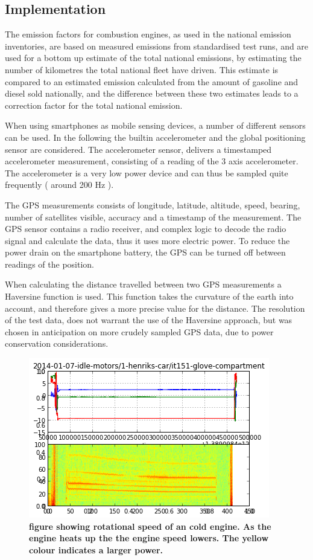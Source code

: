 \subsection {Implementation}
The emission factors for combustion engines, as used in the national emission inventories, are based on measured emissions from standardised test runs, and are used for a bottom up estimate of the total national emissions, by estimating the number of kilometres the total national fleet have driven. This estimate is compared to an estimated emission calculated from the amount of gasoline and diesel sold nationally, and the difference between these two estimates leads to a correction factor for the total national emission.

When using smartphones as mobile sensing devices, a number of different sensors can be used. In the following the builtin accelerometer and the global positioning sensor are considered. The accelerometer sensor, delivers a timestamped accelerometer measurement, consisting of a reading of the 3 axis accelerometer. The accelerometer is a very low power device and can thus be sampled quite frequently ( around 200 Hz ).

The GPS measurements consists of longitude, latitude, altitude, speed, bearing, number of satellites visible, accuracy and a timestamp of the measurement. The GPS sensor contains a radio receiver, and complex logic to decode the radio signal and calculate the data, thus it uses more electric power. To reduce the power drain on the smartphone battery, the GPS can be turned off between readings of the position. 

When calculating the distance travelled between two GPS measurements a Haversine function is used. This function takes the curvature of the earth into account, and therefore gives a more precise value for the distance. The resolution of the test data, does not warrant the use of the Haversine approach, but was chosen in anticipation on more crudely sampled GPS data, due to power conservation considerations.



\begin{figure}[!ht]
\begin{center}
\includegraphics{idle_henrik.png}
\caption{{\bf figure showing rotational speed of an cold engine. As the engine heats up the the engine speed lowers. The yellow colour indicates a larger power.}}
\label{idle_henrik}
\end{center}
\end{figure}



